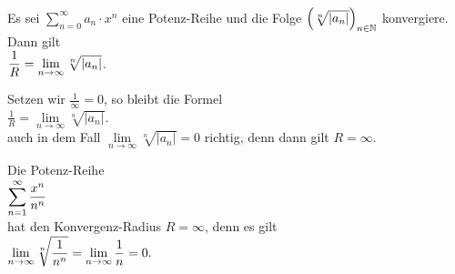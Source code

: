 \begin{Satz}[Hadamard]
Es sei $\sum_{n=0}^\infty a_n\cdot x^n$ eine Potenz-Reihe und die Folge
$\left(\sqrt[n]{|a_n|}\right)_{n\in\mathbb{N}}$ konvergiere.   Dann gilt 
      \\[0.2cm]
      \hspace*{1.3cm}      
      $\displaystyle\frac{1}{R} = \lim\limits_{n\rightarrow\infty} \sqrt[n]{|a_n|}$.  
\end{Satz}

\remark
Setzen wir $\frac{1}{\infty} = 0$, so  bleibt die Formel 
      \\[0.2cm]
      \hspace*{1.3cm}      
      $\frac{1}{R} = \lim\limits_{n\rightarrow\infty} \sqrt[n]{|a_n|}$.  
      \\[0.2cm]
auch in dem Fall
$\lim\limits_{n\rightarrow\infty} \sqrt[n]{|a_n|} = 0$ richtig, denn dann gilt $R = \infty$. \eox


\example
Die Potenz-Reihe
\\[0.2cm]
\hspace*{1.3cm}
 $\displaystyle\sum\limits_{n=1}^\infty \frac{x^n}{n^n}$ 
\\[0.2cm]
hat den Konvergenz-Radius $R=\infty$, denn
es gilt 
\\[0.2cm]
\hspace*{1.3cm}
$\displaystyle \lim\limits_{n\rightarrow\infty} \sqrt[n]{\frac{1}{n^n}} =  
   \lim\limits_{n\rightarrow\infty} \frac{1}{n} = 0.
$ \eox

